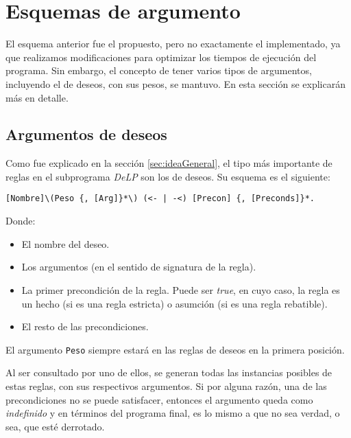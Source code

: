 \documentclass[oneside]{book}
\begin{document}
\section{Esquemas de argumento}

\label{sec:esquemasArgumento}


El esquema anterior fue el propuesto, pero no exactamente el implementado, ya que
realizamos modificaciones para optimizar los tiempos de ejecución del programa. Sin 
embargo, el concepto de tener varios tipos de argumentos, incluyendo el de deseos, con sus
pesos, se mantuvo. En esta sección se explicarán más en detalle.

\subsection{Argumentos de deseos}

\label{sec:argumentosDeDeseos}

Como fue explicado en la sección \ref{sec:ideaGeneral}, el tipo más importante de 
reglas en el subprograma \textit{DeLP} son los de deseos. Su esquema es el siguiente:

\begin{verbatim}
[Nombre]\(Peso {, [Arg]}*\) (<- | -<) [Precon] {, [Preconds]}*.
\end{verbatim}

Donde:

\begin{itemize}
    \item [Nombre] El nombre del deseo.
    \item [Arg] Los argumentos (en el sentido de signatura de la regla).
    \item [Precon] La primer precondición de la regla. Puede ser \textit{true}, en cuyo
    caso, la regla es un hecho (si es una regla estricta) o asumción (si es una regla 
    rebatible).
    \item [Precons] El resto de las precondiciones.

\end{itemize}

El argumento \texttt{Peso} siempre estará en las reglas de deseos en la primera posición.

Al ser consultado por uno de ellos, se generan todas las instancias posibles de estas
reglas, con sus respectivos argumentos. Si por alguna razón, una de las precondiciones no
se puede satisfacer, entonces el argumento queda como \textit{indefinido} %
y en términos del programa final, es lo mismo a que no sea verdad, o sea, que esté 
derrotado. 
\end{document}
